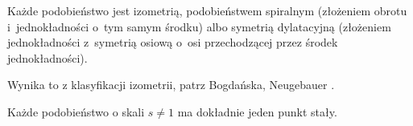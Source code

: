 \begin{proposition}
    Każde podobieństwo jest izometrią, podobieństwem spiralnym (złożeniem obrotu i~jednokładności o~tym samym środku) albo symetrią dylatacyjną (złożeniem jednokładności z~symetrią osiową o~osi przechodzącej przez środek jednokładności).
\end{proposition}

Wynika to z klasyfikacji izometrii, patrz Bogdańska, Neugebauer \cite[s. 220]{neugebauer_2018}.

\begin{proposition}
    Każde podobieństwo o skali $s \neq 1$ ma dokładnie jeden punkt stały.
\end{proposition}

%